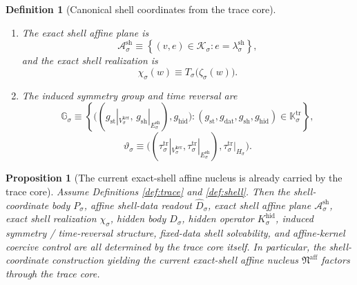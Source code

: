 \documentclass[11pt]{article}
\newcommand{\AffineNucleus}{\mathfrak N^{\mathrm{aff}}}
\newcommand{\GapSpace}[1]{H_{#1}}
\newcommand{\GapBody}[1]{D_{#1}}
\newcommand{\HiddenOperator}[1]{K_{#1}^{\mathrm{hid}}}
\newcommand{\TraceSym}[1]{\mathbb K_{#1}^{\mathrm{tr}}}
\newcommand{\TraceTime}[1]{\tau_{#1}^{\mathrm{tr}}}
\newcommand{\TraceEmbed}[1]{\zeta_{#1}}
\newcommand{\ShellKer}[1]{V_{#1}^{\mathrm{ker}}}
\newcommand{\ShellNormal}[1]{E_{#1}^{\mathrm{sh}}}
\newcommand{\ShellOffset}[1]{\lambda_{#1}^{\mathrm{sh}}}
\newcommand{\CoordSpace}[1]{\mathcal K_{#1}}
\newcommand{\CoordBody}[1]{P_{#1}}
\newcommand{\CoordIso}[1]{T_{#1}}
\newcommand{\AffineData}[1]{\widehat D_{#1}}
\newcommand{\ShellAffine}[1]{\mathcal A_{#1}^{\mathrm{sh}}}
\newcommand{\ShellEmbed}[1]{\chi_{#1}}
\newcommand{\SymGroup}[1]{\mathbb G_{#1}}
\newcommand{\TimeRev}[1]{\vartheta_{#1}}
\newtheorem{definition}{Definition}
\newtheorem{proposition}{Proposition}
\begin{document}
\begin{definition}[Canonical shell coordinates from the trace core]
\begin{enumerate}
\begin{equation}
    \label{eq:tracecoordbody}
    \end{equation}
    \item The exact shell affine plane is
    \begin{equation}
    \ShellAffine{\sigma}
    \equiv
    \left\{
    (v,e)\in\CoordSpace{\sigma}:
    e=\ShellOffset{\sigma}
    \right\},
    \label{eq:traceshellplane}
    \end{equation}
    and the exact shell realization is
    \begin{equation}
    \ShellEmbed{\sigma}(w)
    \equiv
    \CoordIso{\sigma}\bigl(\TraceEmbed{\sigma}(w)\bigr).
    \label{eq:traceshellembed}
    \end{equation}
    \item The induced symmetry group and time reversal are
    \[
    \SymGroup{\sigma}
    \equiv
    \left\{
    \bigl(
    (g_{\mathrm{st}}|_{\ShellKer{\sigma}},\,g_{\mathrm{sh}}|_{\ShellNormal{\sigma}}),
    g_{\mathrm{hid}}
    \bigr):
    (g_{\mathrm{st}},g_{\mathrm{dat}},g_{\mathrm{sh}},g_{\mathrm{hid}})
    \in\TraceSym{\sigma}
    \right\},
    \]
    \[
    \TimeRev{\sigma}
    \equiv
    \bigl(
    (\TraceTime{\sigma}|_{\ShellKer{\sigma}},
    \TraceTime{\sigma}|_{\ShellNormal{\sigma}}),
    \TraceTime{\sigma}|_{\GapSpace{\sigma}}
    \bigr).
    \]
\end{enumerate}
\end{definition}

\begin{proposition}[The current exact-shell affine nucleus is already carried by the trace core]
\label{prop:nucleus}
Assume Definitions \ref{def:trace} and \ref{def:shell}. Then the shell-coordinate body \(\CoordBody{\sigma}\), affine shell-data readout \(\AffineData{\sigma}\), exact shell affine plane \(\ShellAffine{\sigma}\), exact shell realization \(\ShellEmbed{\sigma}\), hidden body \(\GapBody{\sigma}\), hidden operator \(\HiddenOperator{\sigma}\), induced symmetry / time-reversal structure, fixed-data shell solvability, and affine-kernel coercive control are all determined by the trace core itself. In particular, the shell-coordinate construction yielding the current exact-shell affine nucleus \(\AffineNucleus\) factors through the trace core.
\end{proposition}
\end{document}
